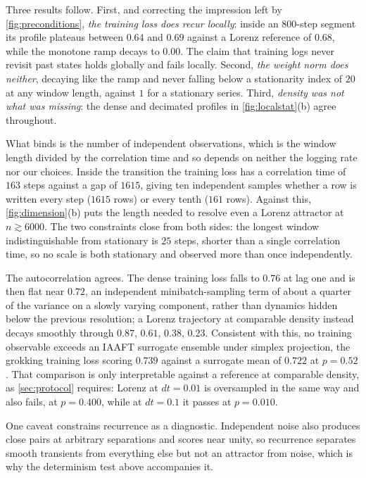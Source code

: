 \documentclass{article}
\begin{document}
Three results follow. First, and correcting the impression left by
\cref{fig:preconditions}, \emph{the training loss does recur locally}: inside an $800$-step
segment its profile plateaus between $0.64$ and $0.69$ against a Lorenz reference of
$0.68$, while the monotone ramp decays to $0.00$. The claim that training logs never
revisit past states holds globally and fails locally. Second, \emph{the weight norm does
neither}, decaying like the ramp and never falling below a stationarity index of $20$ at
any window length, against $1$ for a stationary series. Third, \emph{density was not what was missing}: the dense and decimated
profiles in \cref{fig:localstat}(b) agree throughout.

What binds is the number of independent observations, which is the window length divided by
the correlation time and so depends on neither the logging rate nor our choices. Inside the
transition the training loss has a correlation time of $163$ steps against a gap of
$1615$, giving ten independent samples whether a row is written every step ($1615$ rows) or
every tenth ($161$ rows). Against this, \cref{fig:dimension}(b) puts the length needed to
resolve even a Lorenz attractor at $n \gtrsim 6000$. The two constraints close from both
sides: the longest window indistinguishable from stationary is $25$ steps, shorter than a
single correlation time, so no scale is both stationary and observed more than once
independently.

The autocorrelation agrees. The dense training loss falls to $0.76$ at lag one and is then
flat near $0.72$, an independent minibatch-sampling term of about a quarter of the variance
on a slowly varying component, rather than dynamics hidden below the previous resolution;
a Lorenz trajectory at comparable density instead decays smoothly through $0.87$, $0.61$,
$0.38$, $0.23$. Consistent with this, no training observable exceeds an IAAFT surrogate
ensemble under simplex projection, the grokking training loss scoring $0.739$ against a
surrogate mean of $0.722$ at $p = 0.52$. That comparison is only interpretable against a
reference at comparable density, as \cref{sec:protocol} requires: Lorenz at $dt = 0.01$ is
oversampled in the same way and also fails, at $p = 0.400$, while at $dt = 0.1$ it passes
at $p = 0.010$.

One caveat constrains recurrence as a diagnostic. Independent noise also produces close
pairs at arbitrary separations and scores near unity, so recurrence separates smooth
transients from everything else but not an attractor from noise, which is why the
determinism test above accompanies it.
\end{document}
